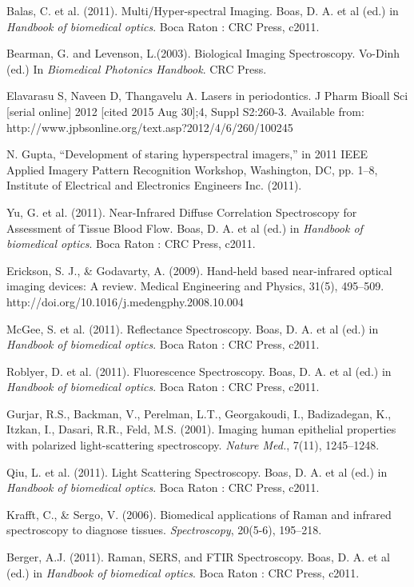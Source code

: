 \documentclass[a4paper]{article}
\begin{document}
\begin{thebibliography}{9}
 Balas, C. et al. (2011). Multi/Hyper-spectral Imaging. Boas, D. A. et al (ed.) in \emph{Handbook of biomedical optics}. Boca Raton : CRC Press, c2011.

 Bearman, G. and Levenson, L.(2003). Biological Imaging Spectroscopy. Vo-Dinh (ed.) In \emph{Biomedical Photonics Handbook}. CRC Press. 

 Elavarasu S, Naveen D, Thangavelu A. Lasers in periodontics. J Pharm Bioall Sci [serial online] 2012 [cited 2015 Aug 30];4, Suppl S2:260-3. Available from: http://www.jpbsonline.org/text.asp?2012/4/6/260/100245

 N. Gupta, “Development of staring hyperspectral imagers,” in 2011 IEEE Applied Imagery Pattern Recognition Workshop, Washington, DC, pp. 1–8, Institute of Electrical and Electronics Engineers Inc. (2011).

 Yu, G. et al. (2011). Near-Infrared Diffuse Correlation Spectroscopy for Assessment of Tissue Blood Flow. Boas, D. A. et al (ed.) in \emph{Handbook of biomedical optics}. Boca Raton : CRC Press, c2011.

 Erickson, S. J., \& Godavarty, A. (2009). Hand-held based near-infrared optical imaging devices: A review. Medical Engineering and Physics, 31(5), 495–509. http://doi.org/10.1016/j.medengphy.2008.10.004

 McGee, S. et al. (2011). Reflectance Spectroscopy. Boas, D. A. et al (ed.) in \emph{Handbook of biomedical optics}. Boca Raton : CRC Press, c2011.

 Roblyer, D. et al. (2011). Fluorescence Spectroscopy. Boas, D. A. et al (ed.) in \emph{Handbook of biomedical optics}. Boca Raton : CRC Press, c2011.

 Gurjar, R.S., Backman, V., Perelman, L.T., Georgakoudi, I., Badizadegan, K.,
Itzkan, I., Dasari, R.R., Feld, M.S. (2001). Imaging human epithelial
properties with polarized light-scattering spectroscopy. \emph{Nature Med.}, 7(11),
1245–1248.

 Qiu, L. et al. (2011). Light Scattering Spectroscopy. Boas, D. A. et al (ed.) in \emph{Handbook of biomedical optics}. Boca Raton : CRC Press, c2011.

 Krafft, C., \& Sergo, V. (2006). Biomedical applications of Raman and infrared spectroscopy to diagnose tissues. \emph{Spectroscopy}, 20(5-6), 195–218.

 Berger, A.J. (2011). Raman, SERS, and FTIR Spectroscopy. Boas, D. A. et al (ed.) in \emph{Handbook of biomedical optics}. Boca Raton : CRC Press, c2011.


\end{thebibliography}
\end{document}
